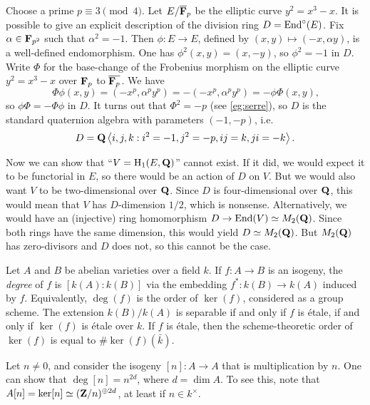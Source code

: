 \begin{example}[Serre]
Choose a prime $p\equiv 3\pmod 4$. Let $E/\overline{\mathbf{F}}_p$ be the elliptic 
curve $y^2=x^3-x$. It is possible to give an explicit description of the 
division ring $D=\operatorname{End}^\circ(E)$. Fix $\alpha\in \mathbf{F}_{p^2}$ such that 
$\alpha^2=-1$. Then $\phi:E\to E$, defined by $(x,y)\mapsto (-x,\alpha y)$, is 
a well-defined endomorphism. One has $\phi^2(x,y)=(x,-y)$, so $\phi^2=-1$ in 
$D$. Write $\Phi$ for the base-change of the Frobenius morphism on the elliptic 
curve $y^2=x^3-x$ over $\mathbf{F}_p$ to $\overline{\mathbf{F}_p}$. We have  
\[
  \Phi \phi(x,y) = (-x^p, \alpha^p y^p) = -(-x^p, \alpha^p y^p) = -\phi \Phi(x,y) \text{,}
\]
so $\phi \Phi=-\Phi \phi$ in $D$. It turns out that $\Phi^2=-p$ (see  
\autoref{eg:serre}), so $D$ is the standard quaternion algebra with parameters 
$(-1,-p)$, i.e.  
\[
  D = \mathbf{Q}\left\langle i,j,k : i^2=-1,j^2=-p,i j=k, j i=-k\right\rangle \text{.}
\]
\end{example}

Now we can show that ``$V=\operatorname{H}_1(E,\mathbf{Q})$'' cannot exist. If it did, we would expect 
it to be functorial in $E$, so there would be an action of $D$ on $V$. But we 
would also want $V$ to be two-dimensional over $\mathbf{Q}$. Since $D$ is 
four-dimensional over $\mathbf{Q}$, this would mean that $V$ has $D$-dimension $1/2$, 
which is nonsense. Alternatively, we would have an (injective) ring 
homomorphism $D\to \operatorname{End}(V)\simeq M_2(\mathbf{Q})$. Since both rings have the same 
dimension, this would yield $D\simeq M_2(\mathbf{Q})$. But $M_2(\mathbf{Q})$ has 
zero-divisors and $D$ does not, so this cannot be the case. 






Let $A$ and $B$ be abelian varieties over a field $k$. If $f:A\to B$ is an 
isogeny, the \emph{degree} of $f$ is $[k(A):k(B)]$ via the embedding 
$f^\ast:k(B) \to k(A)$ induced by $f$. Equivalently, $\deg(f)$ is the order 
of $\ker(f)$, considered as a group scheme. The extension $k(B)/k(A)$ is 
separable if and only if $f$ is \'etale, if and only if $\ker(f)$ is \'etale 
over $k$. If $f$ is \'etale, then the scheme-theoretic order of $\ker(f)$ is 
equal to $\# \ker (f)(\bar k)$. 

\begin{example}
Let $n\ne 0$, and consider the isogeny $[n]:A\to A$ that is multiplication by 
$n$. One can show that $\deg[n]=n^{2 d}$, where $d=\dim A$. To see this,  note 
that $A[n]=\ker[n]\simeq (\mathbf{Z}/n)^{\oplus 2 d}$, at least if $n\in k^\times$. 
\end{example}

